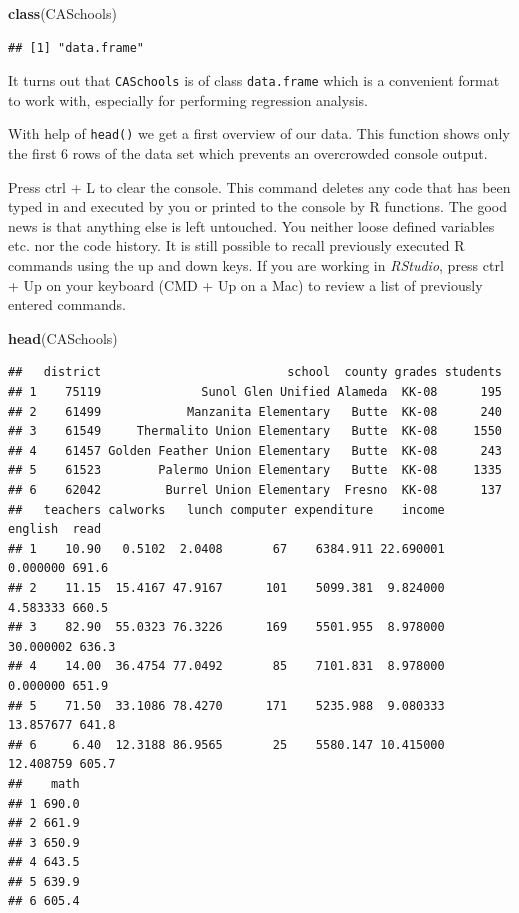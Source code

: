 \documentclass[]{book}
\newenvironment{Shaded}{\begin{snugshade}}{\end{snugshade}}
\newcommand{\KeywordTok}[1]{\textcolor[rgb]{0.13,0.29,0.53}{\textbf{#1}}}
\newcommand{\NormalTok}[1]{#1}
\theoremstyle{definition}
\theoremstyle{definition}
\theoremstyle{definition}
\theoremstyle{remark}
\let\BeginKnitrBlock\begin \let\EndKnitrBlock\end
\begin{document}
\begin{Shaded}
\begin{Highlighting}[]
\KeywordTok{class}\NormalTok{(CASchools)}
\end{Highlighting}
\end{Shaded}

\begin{verbatim}
## [1] "data.frame"
\end{verbatim}

It turns out that \texttt{CASchools} is of class \texttt{data.frame}
which is a convenient format to work with, especially for performing
regression analysis.

With help of \texttt{head()} we get a first overview of our data. This
function shows only the first 6 rows of the data set which prevents an
overcrowded console output.

\BeginKnitrBlock{rmdnote}
Press ctrl + L to clear the console. This command deletes any code that
has been typed in and executed by you or printed to the console by R
functions. The good news is that anything else is left untouched. You
neither loose defined variables etc. nor the code history. It is still
possible to recall previously executed R commands using the up and down
keys. If you are working in \emph{RStudio}, press ctrl + Up on your
keyboard (CMD + Up on a Mac) to review a list of previously entered
commands.
\EndKnitrBlock{rmdnote}

\begin{Shaded}
\begin{Highlighting}[]
\KeywordTok{head}\NormalTok{(CASchools)}
\end{Highlighting}
\end{Shaded}

\begin{verbatim}
##   district                          school  county grades students
## 1    75119              Sunol Glen Unified Alameda  KK-08      195
## 2    61499            Manzanita Elementary   Butte  KK-08      240
## 3    61549     Thermalito Union Elementary   Butte  KK-08     1550
## 4    61457 Golden Feather Union Elementary   Butte  KK-08      243
## 5    61523        Palermo Union Elementary   Butte  KK-08     1335
## 6    62042         Burrel Union Elementary  Fresno  KK-08      137
##   teachers calworks   lunch computer expenditure    income   english  read
## 1    10.90   0.5102  2.0408       67    6384.911 22.690001  0.000000 691.6
## 2    11.15  15.4167 47.9167      101    5099.381  9.824000  4.583333 660.5
## 3    82.90  55.0323 76.3226      169    5501.955  8.978000 30.000002 636.3
## 4    14.00  36.4754 77.0492       85    7101.831  8.978000  0.000000 651.9
## 5    71.50  33.1086 78.4270      171    5235.988  9.080333 13.857677 641.8
## 6     6.40  12.3188 86.9565       25    5580.147 10.415000 12.408759 605.7
##    math
## 1 690.0
## 2 661.9
## 3 650.9
## 4 643.5
## 5 639.9
## 6 605.4
\end{verbatim}
\end{document}

